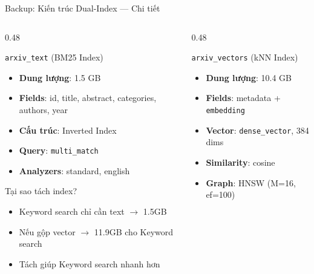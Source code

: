 \begin{frame}{Backup: Kiến trúc Dual-Index --- Chi tiết}
\begin{columns}[T]
\begin{column}{0.48\textwidth}

\begin{block}{\texttt{arxiv\_text} (BM25 Index)}
{\scriptsize
\begin{itemize}\itemsep0pt \parskip0pt 
    \item \textbf{Dung lượng}: 1.5 GB
    \item \textbf{Fields}: id, title, abstract, categories, authors, year
    \item \textbf{Cấu trúc}: Inverted Index
    \item \textbf{Query}: \texttt{multi\_match}
    \item \textbf{Analyzers}: standard, english
\end{itemize}
}
\end{block}

\vspace{-0.1cm}

\begin{exampleblock}{Tại sao tách index?}
{\scriptsize
\begin{itemize}\itemsep0pt \parskip0pt 
    \item Keyword search chỉ cần text $\to$ 1.5GB
    \item Nếu gộp vector $\to$ 11.9GB cho Keyword search
    \item Tách giúp Keyword search nhanh hơn
\end{itemize}
}
\end{exampleblock}

\end{column}
\begin{column}{0.48\textwidth}

\begin{block}{\texttt{arxiv\_vectors} (kNN Index)}
{\scriptsize
\begin{itemize}\itemsep0pt \parskip0pt 
    \item \textbf{Dung lượng}: 10.4 GB
    \item \textbf{Fields}: metadata + \texttt{embedding}
    \item \textbf{Vector}: \texttt{dense\_vector}, 384 dims
    \item \textbf{Similarity}: cosine
    \item \textbf{Graph}: HNSW (M=16, ef=100)
\end{itemize}
}
\end{block}


\end{column}
\end{columns}
\end{frame}
